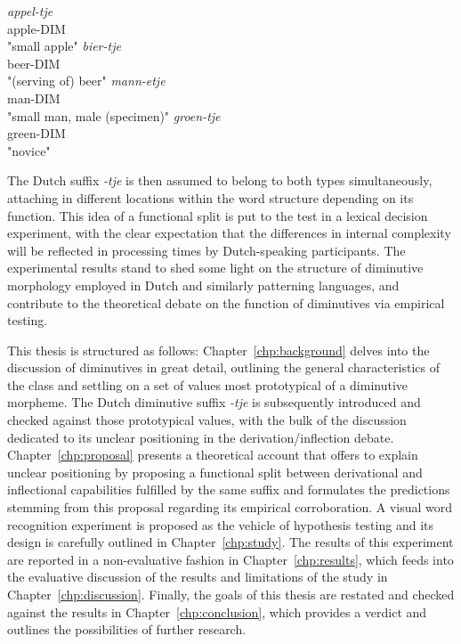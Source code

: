 \begin{exe}
\ex \label{ex:placeholder} 
\begin{multicols}{2}
\begin{xlist}
\ex \gll
\textit{appel-tje} \\
apple-DIM \\
\trans "small apple"
\ex \gll
\textit{bier-tje} \\
beer-DIM \\
\trans "(serving of) beer"
\columnbreak
\ex \gll
\textit{mann-etje} \\
man-DIM \\
\trans "small man, male (specimen)"
\ex \gll
\textit{groen-tje} \\
green-DIM \\
\trans "novice"
\end{xlist}
\end{multicols}
\end{exe}

The Dutch suffix \textit{-tje} is then assumed to belong to both types simultaneously, attaching in different locations within the word structure depending on its function. This idea of a functional split is put to the test in a lexical decision experiment, with the clear expectation that the differences in internal complexity will be reflected in processing times by Dutch-speaking participants. The experimental results stand to shed some light on the structure of diminutive morphology employed in Dutch and similarly patterning languages, and contribute to the theoretical debate on the function of diminutives via empirical testing.

This thesis is structured as follows: Chapter~\ref{chp:background} delves into the discussion of diminutives in great detail, outlining the general characteristics of the class and settling on a set of values most prototypical of a diminutive morpheme. The Dutch diminutive suffix \textit{-tje} is subsequently introduced and checked against those prototypical values, with the bulk of the discussion dedicated to its unclear positioning in the derivation/inflection debate. Chapter~\ref{chp:proposal} presents a theoretical account that offers to explain unclear positioning by proposing a functional split between derivational and inflectional capabilities fulfilled by the same suffix and formulates the predictions stemming from this proposal regarding its empirical corroboration. A visual word recognition experiment is proposed as the vehicle of hypothesis testing and its design is carefully outlined in Chapter~\ref{chp:study}. The results of this experiment are reported in a non-evaluative fashion in Chapter~\ref{chp:results}, which feeds into the evaluative discussion of the results and limitations of the study in Chapter~\ref{chp:discussion}. Finally, the goals of this thesis are restated and checked against the results in Chapter~\ref{chp:conclusion}, which provides a verdict and outlines the possibilities of further research.